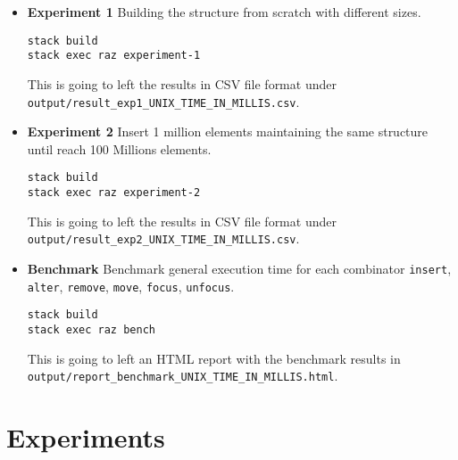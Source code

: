 \begin{itemize}
  \item \textbf{Experiment 1} Building the structure from scratch with different sizes.

\begin{verbatim}
stack build
stack exec raz experiment-1
\end{verbatim}

\setlength{\rightskip}{0pt plus 1 fil}
This is going to left the results in CSV file format under \texttt{output/result_exp1_UNIX_TIME_IN_MILLIS.csv}.


  \item \textbf{Experiment 2} Insert 1 million elements maintaining the same structure until reach 100 Millions elements.

\begin{verbatim}
stack build
stack exec raz experiment-2
\end{verbatim}

\setlength{\rightskip}{0pt plus 1 fil}
This is going to left the results in CSV file format under \texttt{output/result_exp2_UNIX_TIME_IN_MILLIS.csv}.

  \item \textbf{Benchmark} Benchmark general execution time for each combinator \texttt{insert},  \texttt{alter}, \texttt{remove}, \texttt{move}, \texttt{focus}, \texttt{unfocus}.

\begin{verbatim}
stack build
stack exec raz bench
\end{verbatim}

\setlength{\rightskip}{0pt plus 1 fil}
This is going to left an HTML report with the benchmark results in \texttt{output/report_benchmark_UNIX_TIME_IN_MILLIS.html}.


\end{itemize}


\section{Experiments}
